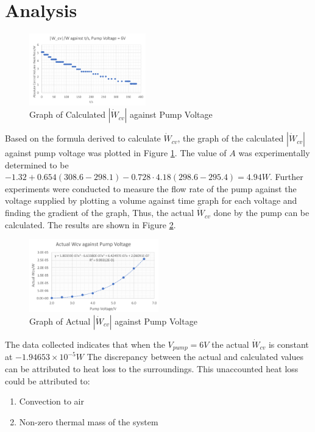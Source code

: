 \documentclass[10pt,a4paper]{IEEEtran}
\begin{document}
	\section{Analysis}
	\begin{figure}[H]
		\begin{center}
			\includegraphics[width=0.45\textwidth]{graph_Wcv.png}
			\caption{Graph of Calculated $|\dot{W}_{cv}|$ against Pump Voltage}
			\label{fig:calculated_Wcv}
		\end{center}
	\end{figure}
	Based on the formula derived to calculate $\dot{W}_{cv}$, the graph of the calculated $|\dot{W}_{cv}|$ against pump voltage was plotted in Figure \ref{fig:calculated_Wcv}.
	The value of $A$ was experimentally determined to be $-1.32 + 0.654(308.6-298.1) - 0.728\cdot 4.18(298.6-295.4) = 4.94 W$.
	Further experiments were conducted to measure the flow rate of the pump against the voltage supplied by plotting a volume against time graph for each voltage and finding the gradient of the graph, Thus, the actual $\dot{W}_{cv}$ done by the pump can be calculated. The results are shown in Figure \ref{fig:actual_Wcv}.
	\begin{figure}[H]
		\begin{center}
			\includegraphics[width=0.5\textwidth]{graph_actualWcvAgainstVoltage.png}
			\caption{Graph of Actual $|\dot{W}_{cv}|$ against Pump Voltage}
			\label{fig:actual_Wcv}
		\end{center}
	\end{figure}
	The data collected indicates that when the $V_{pump} = 6V$ the actual $\dot{W}_{cv}$ is constant at $-1.94653\times 10^{-5} W$  The discrepancy between the actual and calculated values can be attributed to heat loss to the surroundings. This unaccounted heat loss could be attributed to:
	\begin{enumerate}
		\item Convection to air
		\item Non-zero thermal mass of the system
	\end{enumerate}
	
	
\end{document}
